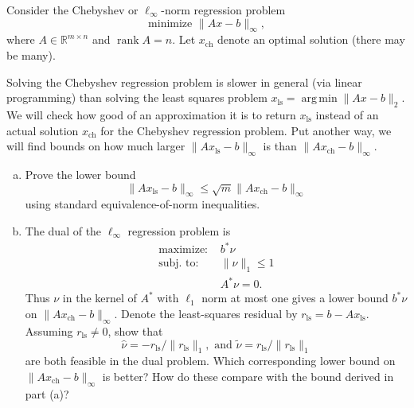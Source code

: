 \documentclass[12pt,letterpaper,cm]{hmcpset}
\newcommand\R{\mathbb{R}}
\begin{document}
\begin{problem}[Boyd 5.6]
    Consider the Chebyshev or $\ell_\infty$-norm regression problem
    \[
        \text{minimize } \|Ax-b\|_\infty,
    \]
    where $A\in\R^{m\times n}$ and $\operatorname{rank} A = n$. Let $x_\text{ch}$ denote an optimal solution (there may be many).

    Solving the Chebyshev regression problem is slower in general (via linear programming) than solving the least squares problem $x_\text{ls} = \operatorname{arg\,min}\|Ax-b\|_2$. We will check how good of an approximation it is to return $x_\text{ls}$ instead of an actual solution $x_\text{ch}$ for the Chebyshev regression problem. Put another way, we will find bounds on how much larger $\|Ax_\text{ls} - b\|_\infty$ is than $\|Ax_\text{ch} - b\|_\infty$.

\begin{enumerate}[(a)]
    \item Prove the lower bound $$\|Ax_\text{ls} - b\|_\infty \leq \sqrt{m}\|Ax_\text{ch} - b\|_\infty$$ using standard equivalence-of-norm inequalities.
    \item The dual of the $\ell_\infty$ regression problem is
        \begin{align*}
            \text{maximize: } & b^*\nu\\
            \text{subj. to: } & \|\nu\|_1\leq 1\\
            & A^*\nu = 0.
        \end{align*}
        Thus $\nu$ in the kernel of $A^*$ with $\ell_1$ norm at most one gives a lower bound $b^*\nu$ on $\|Ax_\text{ch}-b\|_\infty$. Denote the least-squares residual by $r_\text{ls} = b - Ax_\text{ls}$. Assuming $r_\text{ls}\neq 0$, show that
        \[
            \hat\nu = -r_\text{ls} / \|r_\text{ls}\|_1,\text{ and } \widetilde\nu = r_\text{ls} / \|r_\text{ls}\|_1
        \]
        are both feasible in the dual problem. Which corresponding lower bound on $\|Ax_\text{ch} - b\|_\infty$ is better? How do these compare with the bound derived in part (a)?
\end{enumerate}
\end{problem}

\begin{solution}
    \vfill
\end{solution}
\clearpage
\end{document}
